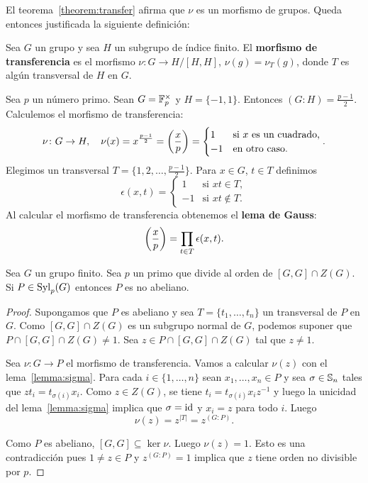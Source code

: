 El teorema~\ref{theorem:transfer} afirma que $\nu$ es un morfismo de grupos.
Queda entonces justificada la siguiente definición:

\begin{definition}
	Sea $G$ un grupo y sea $H$ un subgrupo de índice finito. El
	\textbf{morfismo de transferencia} es el morfismo $\nu\colon G\to H/[H,H]$,
	$\nu(g)=\nu_T(g)$, donde $T$ es algún transversal de $H$ en $G$.
\end{definition}

\begin{example}
	Sea $p$ un número primo. Sean $G=\mathbb{F}_p^\times$ y $H=\{-1,1\}$. Entonces
	$(G:H)=\frac{p-1}{2}$. Calculemos el morfismo de transferencia:
	\[
		\nu\colon G\to H,\quad
		\nu(x)=x^{\frac{p-1}{2}}=\left(\frac{x}{p}\right)=\begin{cases}
			1 & \text{si $x$ es un cuadrado},\\
			-1 & \text{en otro caso}.
		\end{cases}.
	\]
	Elegimos un transversal $T=\{1,2,\dots,\frac{p-1}{2}\}$. Para $x\in G$, $t\in T$ definimos
	\[
	\epsilon(x,t)=\begin{cases}
		1 & \text{si $xt\in T$},\\
		-1 & \text{si $xt\not\in T$}.
	\end{cases}
	\]
	Al calcular el morfismo de transferencia obtenemos el \textbf{lema de
	Gauss}:
	\[
	\left(\frac{x}{p}\right)=\prod_{t\in T}\epsilon(x,t).
	\]
\end{example}

\begin{theorem}
	\label{theorem:P_noabeliano}
	Sea $G$ un grupo finito. Sea $p$ un primo que divide al orden de $[G,G]\cap
	Z(G)$. Si $P\in\mathrm{Syl}_p(G)$ entonces $P$ es no abeliano.
\end{theorem}

\begin{proof}
	Supongamos que $P$ es abeliano y sea $T=\{t_1,\dots,t_n\}$ un transversal
	de $P$ en $G$. Como $[G,G]\cap Z(G)$ es un subgrupo normal de $G$, podemos
	suponer que $P\cap [G,G]\cap Z(G)\ne1$. Sea $z\in P\cap [G,G]\cap Z(G)$ tal
	que $z\ne1$. 

	Sea $\nu\colon G\to P$ el morfismo de transferencia. Vamos a calcular
	$\nu(z)$ con el lema~\ref{lemma:sigma}. Para cada $i\in\{1,\dots,n\}$ sean
	$x_1,\dots,x_n\in P$ y sea $\sigma\in\mathbb{S}_n$ tales que
	$zt_i=t_{\sigma(i)}x_i$. Como $z\in Z(G)$, se tiene
	$t_i=t_{\sigma(i)}x_iz^{-1}$ y luego la unicidad del lema~\ref{lemma:sigma}
	implica que $\sigma=\operatorname{id}$ y $x_i=z$ para todo $i$. Luego 
	\[
	\nu(z)=z^{|T|}=z^{(G:P)}. 
	\]

	Como $P$ es abeliano, $[G,G]\subseteq\ker\nu$. Luego $\nu(z)=1$. Esto es
	una contradicción pues $1\ne z\in P$ y $z^{(G:P)}=1$ implica que $z$ tiene
	orden no divisible por $p$. 
\end{proof}

